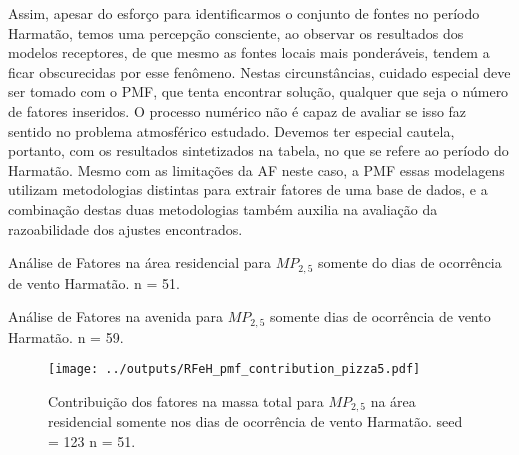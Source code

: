 Assim, apesar do esforço para identificarmos o conjunto de fontes no período 
Harmatão, temos uma percepção consciente, ao observar os resultados dos modelos 
receptores, de que mesmo as fontes locais mais ponderáveis, tendem a ficar 
obscurecidas por esse fenômeno. Nestas circunstâncias, cuidado especial deve 
ser tomado com o PMF, que tenta encontrar solução, qualquer que seja o número 
de fatores inseridos. O processo numérico não
é capaz de avaliar se isso faz sentido no problema atmosférico estudado. 
Devemos ter especial cautela, portanto, com os resultados sintetizados na 
tabela, no que se refere ao período do Harmatão. Mesmo com as limitações da 
AF neste caso, a PMF essas modelagens utilizam metodologias distintas para 
extrair fatores de uma base de dados, e a combinação destas duas 
metodologias também auxilia na avaliação da razoabilidade dos ajustes encontrados. 

\newpage
\begin{table}[H]
  \centering
  
  \caption{Análise de Fatores na área residencial para $MP_{2,5}$
           somente do dias de ocorrência de vento Harmatão. n = 51.
          \label{table:AF_RFeH5}}
\end{table}

\begin{table}[H]
  \centering
  
  \caption{Análise de Fatores na avenida para $MP_{2,5}$
           somente dias de ocorrência de vento Harmatão. n = 59.
          \label{table:AF_TFeH5}}
\end{table}

\begin{landscape}
  \begin{figure}
    \centering
    \begin{minipage}[b]{0.45\linewidth}
      \texttt{[image: ../outputs/RFeH\_pmf\_contribution\_pizza5.pdf]}
      \caption{Contribuição dos fatores na massa total para $MP_{2,5}$ na área
               residencial somente nos dias de ocorrência de vento Harmatão. seed = 123 n = 51.
               \label{fig:RFeH_contribution5}}
    \end{minipage}%
    \hspace{0.5cm}
    \begin{minipage}[b]{0.45\linewidth}
      
    \end{minipage}
  \end{figure}
\end{landscape}

